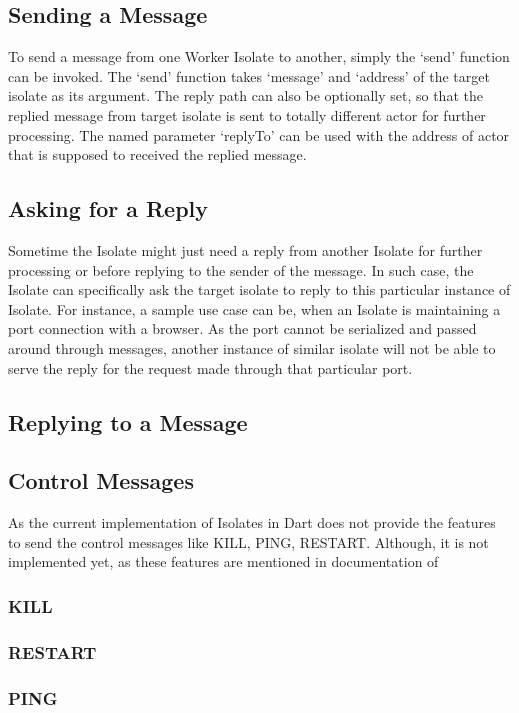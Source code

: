 \subsection{Sending a Message}
To send a message from one Worker Isolate to another, simply the ‘send’ function can be invoked. The ‘send’ function takes ‘message’ and ‘address’ of the target isolate as its argument. The reply path can also be optionally set, so that the replied message from target isolate is sent to totally different actor for further processing. The named parameter ‘replyTo’ can be used with the address of actor that is supposed to received the replied message.

\subsection{Asking for a Reply}
Sometime the Isolate might just need a reply from another Isolate for further processing or before replying to the sender of the message. In such case, the Isolate can specifically ask the target isolate to reply to this particular instance of Isolate.
For instance, a sample use case can be, when an Isolate is maintaining a port connection with a browser. As the port cannot be serialized and passed around through messages, another instance of similar isolate will not be able to serve the reply for the request made through that particular port.

\subsection{Replying to a Message}

\subsection{Control Messages}
As the current implementation of Isolates in Dart does not provide the features to send the control messages like KILL, PING, RESTART. Although, it is not implemented yet, as these features are mentioned in documentation of
\subsubsection{KILL}
\subsubsection{RESTART}
\subsubsection{PING}

